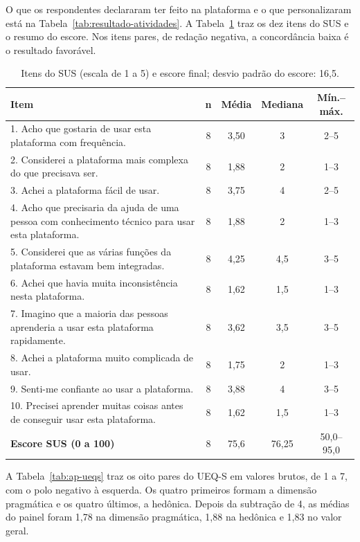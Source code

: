 O que os respondentes declararam ter feito na plataforma e o que personalizaram está na Tabela~\ref{tab:resultado-atividades}. A Tabela~\ref{tab:ap-sus} traz os dez itens do SUS e o resumo do escore. Nos itens pares, de redação negativa, a concordância baixa é o resultado favorável.

\begin{table}[htbp]
\centering
\caption{Itens do SUS (escala de 1 a 5) e escore final; desvio padrão do escore: 16,5.}
\label{tab:ap-sus}
\footnotesize
\renewcommand{\arraystretch}{1.2}
\begin{tabular}{|p{8.4cm}|c|c|c|c|}
\hline
\textbf{Item} & \textbf{n} & \textbf{Média} & \textbf{Mediana} & \textbf{Mín.--máx.} \\\hline
1. Acho que gostaria de usar esta plataforma com frequência. & 8 & 3,50 & 3 & 2--5 \\\hline
2. Considerei a plataforma mais complexa do que precisava ser. & 8 & 1,88 & 2 & 1--3 \\\hline
3. Achei a plataforma fácil de usar. & 8 & 3,75 & 4 & 2--5 \\\hline
4. Acho que precisaria da ajuda de uma pessoa com conhecimento técnico para usar esta plataforma. & 8 & 1,88 & 2 & 1--3 \\\hline
5. Considerei que as várias funções da plataforma estavam bem integradas. & 8 & 4,25 & 4,5 & 3--5 \\\hline
6. Achei que havia muita inconsistência nesta plataforma. & 8 & 1,62 & 1,5 & 1--3 \\\hline
7. Imagino que a maioria das pessoas aprenderia a usar esta plataforma rapidamente. & 8 & 3,62 & 3,5 & 3--5 \\\hline
8. Achei a plataforma muito complicada de usar. & 8 & 1,75 & 2 & 1--3 \\\hline
9. Senti-me confiante ao usar a plataforma. & 8 & 3,88 & 4 & 3--5 \\\hline
10. Precisei aprender muitas coisas antes de conseguir usar esta plataforma. & 8 & 1,62 & 1,5 & 1--3 \\\hline
\textbf{Escore SUS (0 a 100)} & 8 & 75,6 & 76,25 & 50,0--95,0 \\\hline
\end{tabular}
\end{table}

A Tabela~\ref{tab:ap-ueqs} traz os oito pares do UEQ-S em valores brutos, de 1 a 7, com o polo negativo à esquerda. Os quatro primeiros formam a dimensão pragmática e os quatro últimos, a hedônica. Depois da subtração de 4, as médias do painel foram 1,78 na dimensão pragmática, 1,88 na hedônica e 1,83 no valor geral.

